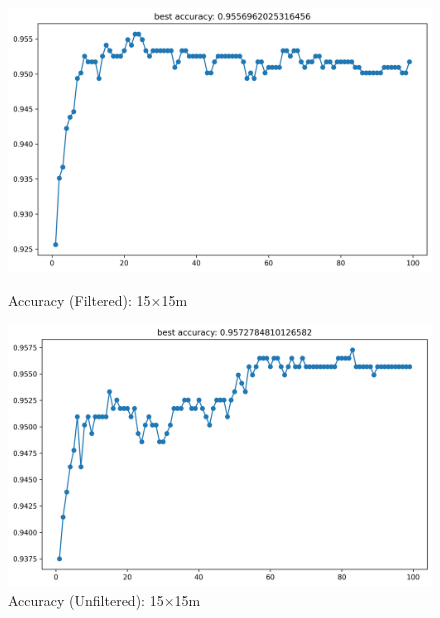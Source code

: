 \documentclass[runningheads]{llncs}
\begin{document}
\begin{figure}[H]
	\centering
	\begin{minipage}{0.49\textwidth}
		\centering
		\includegraphics[width=\textwidth]{figures/filtered/xgb_softmax_acc_15.png}
		\caption*{Accuracy (Filtered): 15×15m}
	\end{minipage}
	\hfill
	\begin{minipage}{0.49\textwidth}
		\centering
		\includegraphics[width=\textwidth]{figures/unfiltered/xgb_softmax_acc_15.png}
		\caption*{Accuracy (Unfiltered): 15×15m}
	\end{minipage}
\end{figure}
\end{document}
